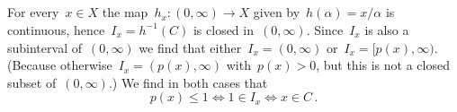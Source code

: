 \subsection{}

For every~$x \in X$ the map~$h_x \colon (0,\infty) \to X$ given by~$h(\alpha) = x/\alpha$ is continuous, hence~$I_x = h^{-1}(C)$ is closed in~$(0,\infty)$.
Since~$I_x$ is also a subinterval of~$(0,\infty)$ we find that either~$I_x = (0,\infty)$ or~$I_x = [p(x), \infty)$.
(Because otherwise~$I_x = (p(x), \infty)$ with~$p(x) > 0$, but this is not a closed subset of~$(0,\infty)$.)
We find in both cases that
\[
        p(x) \leq 1
  \iff  1 \in I_x
  \iff  x \in C \,.
\]




